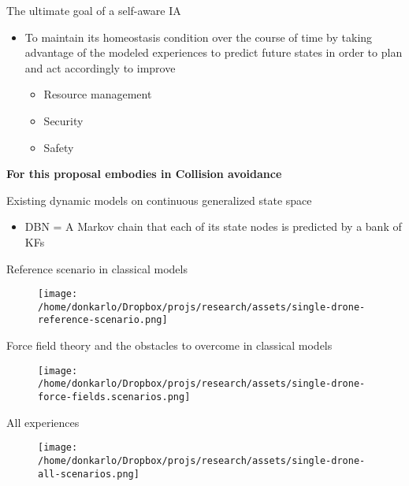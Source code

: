 \documentclass[unknownkeysallowed]{beamer}
\begin{document}
	\begin{frame}{The ultimate goal of a self-aware IA}
		\begin{itemize}
			\item To maintain its homeostasis condition over the course of time by taking advantage of the modeled experiences to predict future states in order to plan and act accordingly to improve
			\begin{itemize}
				\item Resource management
				\item Security
				\item Safety
			\end{itemize}
		\end{itemize}
		\textbf{For this proposal embodies in \textbf{Collision avoidance}}
	\end{frame}

	\begin{frame}{Existing dynamic models on continuous generalized state space}
		\begin{itemize}
			\item DBN = A Markov chain that each of its state nodes is predicted by a bank of KFs 
		\end{itemize}
	\end{frame}

	\begin{frame}{Reference scenario in classical models}
		\begin{figure}
			\texttt{[image: /home/donkarlo/Dropbox/projs/research/assets/single-drone-reference-scenario.png]}
		\end{figure}
	\end{frame}

	\begin{frame}{Force field theory and the obstacles to overcome in classical models}
		\begin{figure}
			\texttt{[image: /home/donkarlo/Dropbox/projs/research/assets/single-drone-force-fields.scenarios.png]}
		\end{figure}
	\end{frame}

	\begin{frame}{All experiences}
		\begin{figure}
			\texttt{[image: /home/donkarlo/Dropbox/projs/research/assets/single-drone-all-scenarios.png]}
		\end{figure}
	\end{frame}
\end{document}
